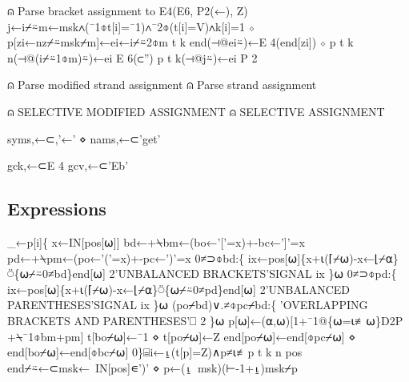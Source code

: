 \documentclass{article}%
\begin{document}
⍝ Parse bracket assignment to E4(E6, P2(←), Z)
j←i⌿⍨m←msk∧(¯1⌽t[i]=¯1)∧¯2⌽(t[i]=V)∧k[i]=1 ⋄ p[zi←nz⌿⍨msk⌿m]←ei←i⌿⍨2⌽m
t k end(⊣@ei⍨)←E 4(end[zi]) ⋄ p t k n(⊣@(i⌿⍨1⌽m)⍨)←ei E 6(⊂'')
p t k(⊣@j⍨)←ei P 2

⍝ Parse modified strand assignment
⍝ Parse strand assignment

⍝ SELECTIVE MODIFIED ASSIGNMENT
⍝ SELECTIVE ASSIGNMENT
\nwendcode{}\nwdocspar

\nwenddocs{}\plusendmoddef\nwstartdeflinemarkup{}\nwenddeflinemarkup
syms,←⊂,'←' ⋄ nams,←⊂'get'
\nwendcode{}\nwdocspar

\nwenddocs{}\plusendmoddef\nwstartdeflinemarkup{}\nwenddeflinemarkup
gck,←⊂E 4
gcv,←⊂'Eb'
\nwendcode{}\nwdocspar

\subsection{Expressions}

\nwenddocs{}\endmoddef\nwstartdeflinemarkup{}\nwenddeflinemarkup
_←p[i]\{
        x←IN[pos[⍵]]
        bd←+⍀bm←(bo←'['=x)+-bc←']'=x
        pd←+⍀pm←(po←'('=x)+-pc←')'=x
        0≠⊃⌽bd:\{
                ix←pos[⍵]\{x+⍳(⌈⌿⍵)-x←⌊⌿⍺\}⍥\{⍵⌿⍨0≠bd\}end[⍵]
                2'UNBALANCED BRACKETS'SIGNAL ix
        \}⍵
        0≠⊃⌽pd:\{
                ix←pos[⍵]\{x+⍳(⌈⌿⍵)-x←⌊⌿⍺\}⍥\{⍵⌿⍨0≠pd\}end[⍵]
                2'UNBALANCED PARENTHESES'SIGNAL ix
        \}⍵
        (po⌿bd)∨.≠⌽pc⌿bd:\{
                'OVERLAPPING BRACKETS AND PARENTHESES'⎕ 2
        \}⍵
        p[⍵]←(⍺,⍵)[1+¯1@\{⍵=⍳≢⍵\}D2P +⍀¯1⌽bm+pm]
        t[bo⌿⍵]←¯1 ⋄ t[po⌿⍵]←Z
        end[po⌿⍵]←end[⌽pc⌿⍵] ⋄ end[bo⌿⍵]←end[⌽bc⌿⍵]
0\}⌸i←⍸(t[p]=Z)∧p≠⍳≢p
t k n pos end⌿⍨←⊂msk←~IN[pos]∊')' ⋄ p←(⍸~msk)(⊢-1+⍸)msk⌿p
\nwendcode{}\nwdocspar
\end{document}
